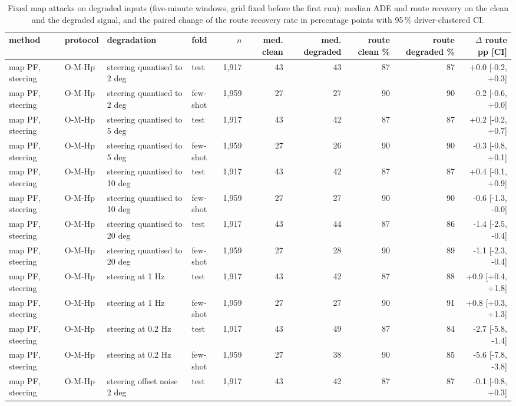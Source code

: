 \begin{table}[t]\centering\scriptsize\setlength{\tabcolsep}{3pt}
\caption{Fixed map attacks on degraded inputs (five-minute windows, grid fixed before the first run): median ADE and route recovery on the clean and the degraded signal, and the paired change of the route recovery rate in percentage points with 95\,\% driver-clustered CI.}\label{tab:supp_robust_map}
\begin{tabular}{llllrrrrrr}\toprule
method & protocol & degradation & fold & $n$ & med. clean & med. degraded & route clean \% & route degraded \% & $\Delta$ route pp [CI] \\\midrule
map PF, steering & O-M-Hp & steering quantised to 2 deg & test & 1{,}917 & 43 & 43 & 87 & 87 & +0.0 [-0.2, +0.3] \\
map PF, steering & O-M-Hp & steering quantised to 2 deg & few-shot & 1{,}959 & 27 & 27 & 90 & 90 & -0.2 [-0.6, +0.0] \\
map PF, steering & O-M-Hp & steering quantised to 5 deg & test & 1{,}917 & 43 & 42 & 87 & 87 & +0.2 [-0.2, +0.7] \\
map PF, steering & O-M-Hp & steering quantised to 5 deg & few-shot & 1{,}959 & 27 & 26 & 90 & 90 & -0.3 [-0.8, +0.1] \\
map PF, steering & O-M-Hp & steering quantised to 10 deg & test & 1{,}917 & 43 & 42 & 87 & 87 & +0.4 [-0.1, +0.9] \\
map PF, steering & O-M-Hp & steering quantised to 10 deg & few-shot & 1{,}959 & 27 & 27 & 90 & 90 & -0.6 [-1.3, -0.0] \\
map PF, steering & O-M-Hp & steering quantised to 20 deg & test & 1{,}917 & 43 & 44 & 87 & 86 & -1.4 [-2.5, -0.4] \\
map PF, steering & O-M-Hp & steering quantised to 20 deg & few-shot & 1{,}959 & 27 & 28 & 90 & 89 & -1.1 [-2.3, -0.4] \\
map PF, steering & O-M-Hp & steering at 1 Hz & test & 1{,}917 & 43 & 42 & 87 & 88 & +0.9 [+0.4, +1.8] \\
map PF, steering & O-M-Hp & steering at 1 Hz & few-shot & 1{,}959 & 27 & 27 & 90 & 91 & +0.8 [+0.3, +1.3] \\
map PF, steering & O-M-Hp & steering at 0.2 Hz & test & 1{,}917 & 43 & 49 & 87 & 84 & -2.7 [-5.8, -1.4] \\
map PF, steering & O-M-Hp & steering at 0.2 Hz & few-shot & 1{,}959 & 27 & 38 & 90 & 85 & -5.6 [-7.8, -3.8] \\
map PF, steering & O-M-Hp & steering offset noise 2 deg & test & 1{,}917 & 43 & 42 & 87 & 87 & -0.1 [-0.8, +0.3] \\

\end{tabular}
\end{table}
